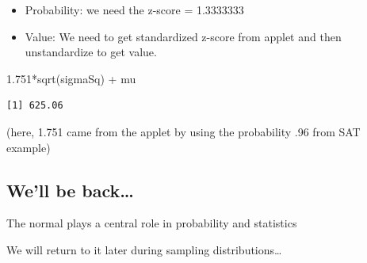 \documentclass[
  letterpaper,
  DIV=11,
  numbers=noendperiod]{scrartcl}
\newenvironment{Shaded}{\begin{snugshade}}{\end{snugshade}}
\newcommand{\FloatTok}[1]{\textcolor[rgb]{0.68,0.00,0.00}{#1}}
\newcommand{\FunctionTok}[1]{\textcolor[rgb]{0.28,0.35,0.67}{#1}}
\newcommand{\NormalTok}[1]{\textcolor[rgb]{0.00,0.23,0.31}{#1}}
\newcommand{\SpecialCharTok}[1]{\textcolor[rgb]{0.37,0.37,0.37}{#1}}
\providecommand{\tightlist}{%
  \setlength{\itemsep}{0pt}\setlength{\parskip}{0pt}}
\begin{document}
\begin{itemize}
\tightlist
\item
  {Probability:} we need the z-score = 1.3333333
\item
  {Value:} We need to get standardized z-score from applet and then
  unstandardize to get value.
\end{itemize}

\begin{Shaded}
\begin{Highlighting}[]
\FloatTok{1.751}\SpecialCharTok{*}\FunctionTok{sqrt}\NormalTok{(sigmaSq) }\SpecialCharTok{+}\NormalTok{ mu}
\end{Highlighting}
\end{Shaded}

\begin{verbatim}
[1] 625.06
\end{verbatim}

{(here, 1.751 came from the applet by using the probability .96 from SAT
example)}

\subsection{We'll be back\ldots{}}\label{well-be-back}

The normal plays a {central} role in probability and statistics

We will return to it later during {sampling distributions}\ldots{}
\end{document}
